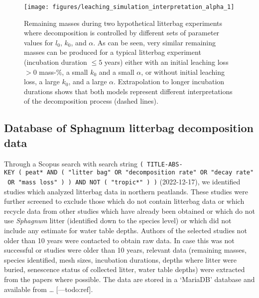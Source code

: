 \documentclass[
  12pt,
]{article}
\begin{document}
\begin{figure}[H]

{\centering \texttt{[image: figures/leaching\_simulation\_interpretation\_alpha\_1]} 

}

\caption{Remaining masses during two hypothetical litterbag experiments where decomposition is controlled by different sets of parameter values for \(l_0\), \(k_0\), and \(\alpha\). As can be seen, very similar remaining masses can be produced for a typical litterbag experiment (incubation duration \(\le5\) years) either with an initial leaching loss \(>0\) mass-\%, a small \(k_0\) and a small \(\alpha\), or without initial leaching loss, a large \(k_0\), and a large \(\alpha\). Extrapolation to longer incubation durations shows that both models represent different interpretations of the decomposition process (dashed lines).}\label{fig:out-leaching-sim-interpretation-alpha}
\end{figure}

\hypertarget{database-of-sphagnum-litterbag-decomposition-data}{%
\subsection{Database of Sphagnum litterbag decomposition data}\label{database-of-sphagnum-litterbag-decomposition-data}}

Through a Scopus search with search string \texttt{(\ TITLE-ABS-KEY\ (\ peat*\ AND\ (\ "litter\ bag"\ OR\ "decomposition\ rate"\ OR\ "decay\ rate"\ OR\ "mass\ loss"\ )\ )\ AND\ NOT\ (\ "tropic*"\ )\ )} (2022-12-17), we identified studies which analyzed litterbag data in northern peatlands. These studies were further screened to exclude those which do not contain litterbag data or which recycle data from other studies which have already been obtained or which do not use \emph{Sphagnum} litter (identified down to the species level) or which did not include any estimate for water table depths. Authors of the selected studies not older than 10 years were contacted to obtain raw data. In case this was not successful or studies were older than 10 years, relevant data (remaining masses, species identified, mesh sizes, incubation durations, depths where litter were buried, senescence status of collected litter, water table depths) were extracted from the papers where possible. The data are stored in a `MariaDB' database and available from \ldots{} {[}---todo:ref{]}.
\end{document}
